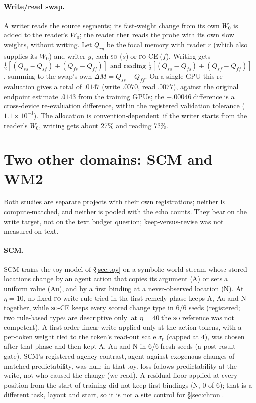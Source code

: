 \documentclass[11pt]{article}
\newcommand{\FO}{\textsc{fo}}
\newcommand{\SO}{\textsc{so}}
\begin{document}
\paragraph{Write/read swap.} A writer reads the source segments; its fast-weight change from its own
$W_0$ is added to the reader's $W_0$; the reader then reads the probe with its own slow weights,
without writing. Let $Q_{ry}$ be the focal memory with reader $r$ (which also supplies its $W_0$)
and writer $y$, each \SO{} ($s$) or \FO-CE{} ($f$). Writing gets
$\tfrac12[(Q_{ss}-Q_{sf})+(Q_{fs}-Q_{ff})]$ and reading $\tfrac12[(Q_{ss}-Q_{fs})+(Q_{sf}-Q_{ff})]$,
summing to the swap's own $\Delta M=Q_{ss}-Q_{ff}$. On a single GPU this re-evaluation gives a total
of $.0147$ (write $.0070$, read $.0077$), against the original endpoint estimate $.0143$ from the
training GPUs; the $+.00046$ difference is a cross-device re-evaluation difference, within the
registered validation tolerance ($1.1\times10^{-3}$). The allocation is
convention-dependent: if the writer starts from the reader's $W_0$, writing gets about 27\% and reading
73\%.

\FloatBarrier

\section{Two other domains: SCM and WM2}
\label{app:domains}

Both studies are separate projects with their own registrations; neither is compute-matched, and
neither is pooled with the echo counts. They bear on the write target, not on the text budget
question; keep-versus-revise was not measured on text.

\paragraph{SCM.} SCM trains the toy model of \S\ref{sec:toy} on a symbolic world stream whose stored
locations change by an agent action that copies its argument (A) or sets a uniform value (Au), and by a
first binding at a never-observed location (N). At $\eta=10$, no fixed \FO{} write rule tried in the
first remedy phase keeps A, Au and N together, while \SO-CE{} keeps every scored change type in 6/6
seeds (registered; two rule-based types are descriptive only; at $\eta=40$ the \SO{} reference was not
competent). A first-order linear write applied only at the action tokens, with a per-token weight tied
to the token's read-out scale $\sigma_t$ (capped at 4), was chosen after that phase and then kept A, Au
and N in 6/6 fresh seeds (a post-result gate). SCM's registered agency contrast, agent against
exogenous changes of matched predictability, was null: in that toy, loss follows predictability at the
write, not who caused the change (we read). A residual floor applied at every position from the start
of training did not keep first bindings (N, 0 of 6); that is a different task, layout and start, so it
is not a site control for \S\ref{sec:chron}.
\end{document}
